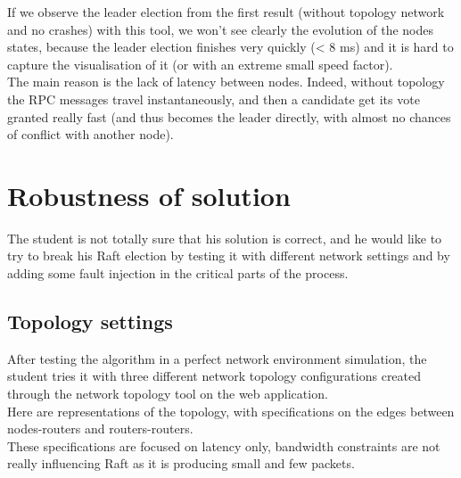 \documentclass{eplmastersthesis}
\begin{document}
      If we observe the leader election from the first result (without
      topology network and no crashes) with this tool, we won't see clearly
      the evolution of the nodes states, because the leader election finishes
      very quickly (< 8 ms) and it is hard to capture the visualisation of it
      (or with an extreme small speed factor).\\
      The main reason is the lack of latency between nodes. Indeed, without
      topology the RPC messages travel instantaneously, and then a candidate
      get its vote granted really fast (and thus becomes the leader directly,
      with almost no chances of conflict with another node).

    \section{Robustness of solution}

      The student is not totally sure that his solution is correct, and he would
      like to try to break his Raft election by testing it with different
      network settings and by adding some fault injection in the critical
      parts of the process.

      \subsection{Topology settings}

        After testing the algorithm in a perfect network environment
        simulation, the student tries it with three different network
        topology configurations created through the network topology tool on
        the web application.\\
        Here are representations of the topology, with specifications on
        the edges between nodes-routers and routers-routers.\\
        These specifications are focused on latency only, bandwidth constraints
        are not really influencing Raft as it is producing small and few
        packets.
\end{document}
